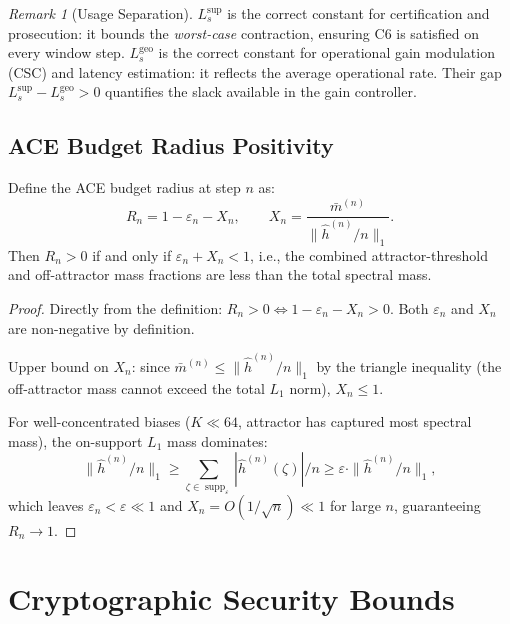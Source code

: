 \documentclass[12pt,letterpaper]{article}
\theoremstyle{definition}
\theoremstyle{plain}
\theoremstyle{remark}
\newtheorem*{remark}{Remark}
\newcommand{\supp}{\operatorname{supp}}
\newcommand{\hhat}{\hat{h}}
\newcommand{\mbar}{\bar{m}}
\newcommand{\Lsup}{L_s^{\sup}}
\newcommand{\Lgeo}{L_s^{\mathrm{geo}}}
\begin{document}
\begin{remark}[Usage Separation]
$\Lsup$ is the correct constant for certification and prosecution:
it bounds the \emph{worst-case} contraction, ensuring C6 is satisfied
on every window step.  $\Lgeo$ is the correct constant for
operational gain modulation (CSC) and latency estimation: it reflects
the average operational rate.  Their gap $\Lsup - \Lgeo > 0$ quantifies
the slack available in the gain controller.
\end{remark}

\subsection{ACE Budget Radius Positivity}

\begin{proposition}
\label{prop:ace-radius}
Define the ACE budget radius at step $n$ as:
\[
  R_n = 1 - \varepsilon_n - X_n,
  \qquad
  X_n = \frac{\mbar^{(n)}}{\|\hhat^{(n)}/n\|_1}.
\]
Then $R_n > 0$ if and only if $\varepsilon_n + X_n < 1$, i.e., the combined
attractor-threshold and off-attractor mass fractions are less than the
total spectral mass.
\end{proposition}

\begin{proof}
Directly from the definition: $R_n > 0 \iff 1 - \varepsilon_n - X_n > 0$.
Both $\varepsilon_n$ and $X_n$ are non-negative by definition.

Upper bound on $X_n$: since $\mbar^{(n)} \le \|\hhat^{(n)}/n\|_1$ by
the triangle inequality (the off-attractor mass cannot exceed the total
$L_1$ norm), $X_n \le 1$.

For well-concentrated biases ($K \ll 64$, attractor has captured most
spectral mass), the on-support $L_1$ mass dominates:
\[
  \|\hhat^{(n)}/n\|_1
    \ge \sum_{\zeta\in\supp_\varepsilon}|\hhat^{(n)}(\zeta)|/n
    \ge \varepsilon\cdot\|\hhat^{(n)}/n\|_1,
\]
which leaves $\varepsilon_n < \varepsilon \ll 1$ and
$X_n = O(1/\sqrt{n}) \ll 1$ for large $n$, guaranteeing $R_n \to 1$.
\end{proof}

\section{Cryptographic Security Bounds}
\end{document}
